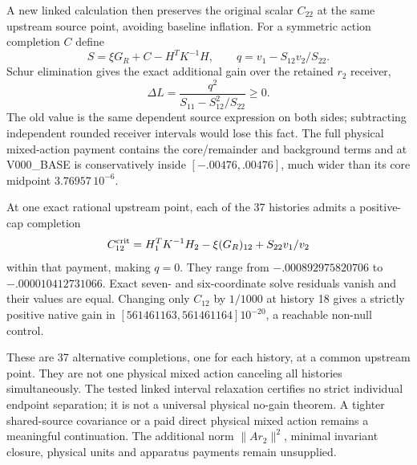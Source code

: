 A new linked calculation then preserves the original scalar $C_{22}$
at the same upstream source point, avoiding baseline inflation. For a
symmetric action completion $C$ define
\begin{equation}
 S=\xi G_R+C-H^TK^{-1}H,\qquad
 q=v_1-S_{12}v_2/S_{22}.
\end{equation}
Schur elimination gives the exact additional gain over the retained
$r_2$ receiver,
\begin{equation}
 \Delta L=\frac{q^2}{S_{11}-S_{12}^2/S_{22}}\ge0.
\label{eq:linked-gain-12}
\end{equation}
The old value is the same dependent source expression on both sides;
subtracting independent rounded receiver intervals would lose this fact.
The full physical mixed-action payment contains the core/remainder and
background terms and at V000\_BASE is conservatively inside
$[-.00476,.00476]$, much wider than its core midpoint
$3.76957\,10^{-6}$.

At one exact rational upstream point, each of the 37 histories admits a
positive-cap completion
\begin{equation}
 C_{12}^{\rm crit}=H_1^TK^{-1}H_2-\xi(G_R)_{12}
                                      +S_{22}v_1/v_2
\end{equation}
within that payment, making $q=0$. They range from
$-.000892975820706$ to $-.000010412731066$. Exact seven- and six-coordinate
solve residuals vanish and their values are equal. Changing only $C_{12}$
by $1/1000$ at history 18 gives a strictly positive native gain in
$[561461163,561461164]10^{-20}$, a reachable non-null control.

These are 37 alternative completions, one for each history, at a common
upstream point. They are not one physical mixed action canceling all
histories simultaneously. The tested linked interval relaxation certifies
no strict individual endpoint separation; it is not a universal physical
no-gain theorem. A tighter shared-source covariance or a paid direct
physical mixed action remains a meaningful continuation. The additional
norm $\|Ar_2\|^2$, minimal invariant closure, physical units and apparatus
payments remain unsupplied.
